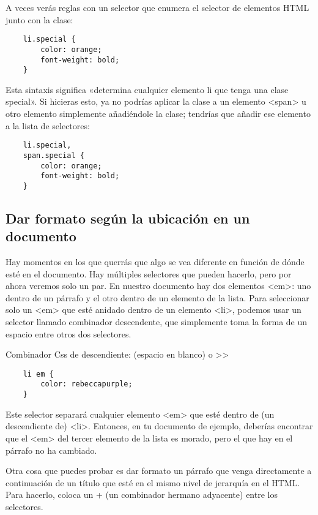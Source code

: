 \begin{enumerate}
A veces verás reglas con un selector que enumera el selector de elementos HTML junto con la clase:

\begin{lstlisting}
	li.special {
		color: orange;
		font-weight: bold;
	}
\end{lstlisting}

Esta sintaxis significa «determina cualquier elemento li que tenga una clase special». Si hicieras esto, ya no podrías aplicar la clase a un elemento <span> u otro elemento simplemente añadiéndole la clase; tendrías que añadir ese elemento a la lista de selectores:

\begin{lstlisting}
	li.special,
	span.special {
		color: orange;
		font-weight: bold;
	}
\end{lstlisting}

\subsection{Dar formato según la ubicación en un documento}
Hay momentos en los que querrás que algo se vea diferente en función de dónde esté en el documento. Hay múltiples selectores que pueden hacerlo, pero por ahora veremos solo un par. En nuestro documento hay dos elementos <em>: uno dentro de un párrafo y el otro dentro de un elemento de la lista. Para seleccionar solo un <em> que esté anidado dentro de un elemento <li>, podemos usar un selector llamado combinador descendente, que simplemente toma la forma de un espacio entre otros dos selectores.

\begin{remark}
Combinador Css de descendiente: (espacio en blanco) o >>
\end{remark}

\begin{lstlisting}
	li em {
		color: rebeccapurple;
	}
\end{lstlisting}

Este selector separará cualquier elemento <em> que esté dentro de (un descendiente de) <li>. Entonces, en tu documento de ejemplo, deberías encontrar que el <em> del tercer elemento de la lista es morado, pero el que hay en el párrafo no ha cambiado.


Otra cosa que puedes probar es dar formato un párrafo que venga directamente a continuación de un título que esté en el mismo nivel de jerarquía en el HTML. Para hacerlo, coloca un + (un combinador hermano adyacente) entre los selectores.


\end{enumerate}
